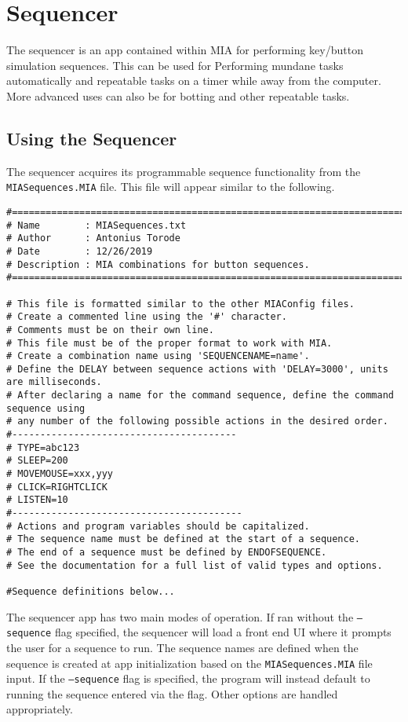 \chapter{Sequencer} \label{sequencer}
\pagestyle{fancy}

The sequencer is an app contained within MIA for performing key/button simulation sequences. This can be used for Performing mundane tasks automatically and repeatable tasks on a timer while away from the computer. More advanced uses can also be for botting and other repeatable tasks.

\section{Using the Sequencer}

The sequencer acquires its programmable sequence functionality from the \texttt{MIASequences.MIA} file. This file will appear similar to the following.

\begin{lstlisting}[style=pythonstyle]
#============================================================================
# Name        : MIASequences.txt
# Author      : Antonius Torode
# Date        : 12/26/2019
# Description : MIA combinations for button sequences.
#============================================================================

# This file is formatted similar to the other MIAConfig files.
# Create a commented line using the '#' character. 
# Comments must be on their own line.
# This file must be of the proper format to work with MIA.
# Create a combination name using 'SEQUENCENAME=name'.
# Define the DELAY between sequence actions with 'DELAY=3000', units are milliseconds.
# After declaring a name for the command sequence, define the command sequence using 
# any number of the following possible actions in the desired order.
#----------------------------------------
# TYPE=abc123
# SLEEP=200
# MOVEMOUSE=xxx,yyy
# CLICK=RIGHTCLICK
# LISTEN=10
#-----------------------------------------
# Actions and program variables should be capitalized.
# The sequence name must be defined at the start of a sequence.
# The end of a sequence must be defined by ENDOFSEQUENCE.
# See the documentation for a full list of valid types and options.

#Sequence definitions below...
\end{lstlisting}

The sequencer app has two main modes of operation. If ran without the \texttt{--sequence} flag specified, the sequencer will load a front end UI where it prompts the user for a sequence to run. The sequence names are defined when the sequence is created at app initialization based on the \texttt{MIASequences.MIA} file input. If the \texttt{--sequence} flag is specified, the program will instead default to running the sequence entered via the flag. Other options are handled appropriately.

